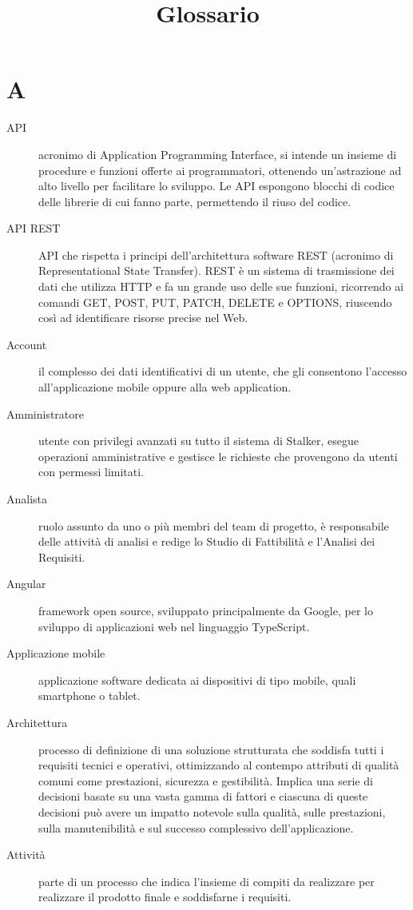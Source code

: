 \documentclass{article}
\title{Glossario}
\begin{document}



\section{A}
\begin{description}
  \item[API] acronimo di Application Programming Interface, si intende un insieme di procedure e funzioni offerte ai programmatori, ottenendo un'astrazione ad alto livello per facilitare lo sviluppo. Le API espongono blocchi di codice delle librerie di cui fanno parte, permettendo il riuso del codice.
  \item[API REST] API che rispetta i principi dell'architettura software REST (acronimo di Representational State Transfer). REST è un sistema di trasmissione dei dati che utilizza HTTP e fa un grande uso delle sue funzioni, ricorrendo ai comandi GET, POST, PUT, PATCH, DELETE e OPTIONS, riuscendo così ad identificare risorse precise nel Web.
  \item[Account] il complesso dei dati identificativi di un utente, che gli consentono l'accesso all'applicazione mobile oppure alla web application.
  \item[Amministratore] utente con privilegi avanzati su tutto il sistema di Stalker, esegue operazioni amministrative e gestisce le richieste che provengono da utenti con permessi limitati.
  \item[Analista] ruolo assunto da uno o più membri del team di progetto, è responsabile delle attività di analisi e redige lo Studio di Fattibilità e l'Analisi dei Requisiti.
  \item[Angular] framework open source, sviluppato principalmente da Google, per lo sviluppo di applicazioni web nel linguaggio TypeScript.
  \item[Applicazione mobile] applicazione software dedicata ai dispositivi di tipo mobile, quali smartphone o tablet.
  \item[Architettura] processo di definizione di una soluzione strutturata che soddisfa tutti i requisiti tecnici e operativi, ottimizzando al contempo attributi di qualità comuni come prestazioni, sicurezza e gestibilità. Implica una serie di decisioni basate su una vasta gamma di fattori e ciascuna di queste decisioni può avere un impatto notevole sulla qualità, sulle prestazioni, sulla manutenibilità e sul successo complessivo dell'applicazione.
  \item[Attività] parte di un processo che indica l'insieme di compiti da realizzare per realizzare il prodotto finale e soddisfarne i requisiti.
\end{description}
\newpage
\end{document}
